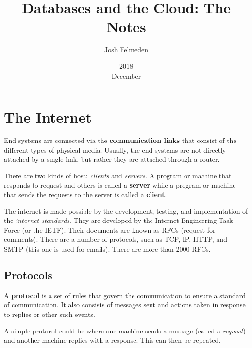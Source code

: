 \documentclass[11pt,a4paper,titlepage,dvipsnames,cmyk]{scrartcl}
\title{Databases and the Cloud: The Notes}
\date{2018\\ December}
\author{Josh Felmeden}
\begin{document}
\maketitle

\tableofcontents
\newpage
{}

\section{The Internet}%
\label{sec:The Internet}
End systems are connected via the \textbf{communication links} that
consist of the different types of physical media. Usually, the end systems
are not directly attached by a single link, but rather they are attached
through a router.

There are two kinds of host: \textit{clients} and \textit{servers}. A
program or machine that responds to request and others is called a
\textbf{server} while a program or machine that sends the requests to the
server is called a \textbf{client}.

The internet is made possible by the development, testing, and
implementation of the \textit{internet standards}. They are developed by
the Internet Engineering Task Force (or the IETF). Their documents are
known as RFCs (request for comments). There are a number of protocols,
such as TCP, IP, HTTP, and SMTP (this one is used for emails). There are
more than 2000 RFCs.

\subsection{Protocols}%
\label{sub:Protocols}
A \textbf{protocol} is a set of rules that govern the communication to
ensure a standard of communication. It also consists of messages sent and
actions taken in response to replies or other such events.

A simple protocol could be where one machine sends a message (called a
\textit{request}) and another machine replies with a response. This can
then be repeated.
\end{document}
